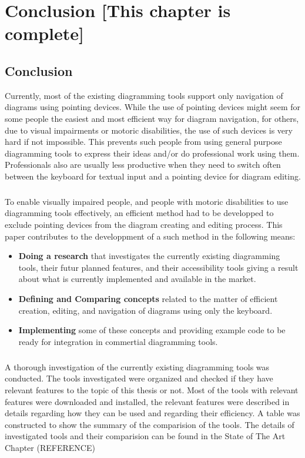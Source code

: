\chapter{Conclusion [This chapter is complete]}\label{chap:concl}
\beginchapter

\section{Conclusion}
Currently, most of the existing diagramming tools support only navigation of diagrams using pointing devices. While the use of pointing devices might seem for some people the easiest and most efficient way for diagram navigation, for others, due to visual impairments or motoric disabilities, the use of such devices is very hard if not impossible. This prevents such people from using general purpose diagramming tools to express their ideas and/or do professional work using them. Professionals also are usually less productive when they need to switch often between the keyboard for textual input and a pointing device for diagram editing. 

\paragraph{}
To enable visually impaired people, and people with motoric disabilities to use diagramming tools effectively, an efficient method had to be developped to exclude pointing devices from the diagram creating and editing process. This paper contributes to the developpment of a such method in the following means:
\begin{itemize}
\item {\bf Doing a research} that investigates the currently existing diagramming tools, their futur planned features, and their accessibility tools giving a result about what is currently implemented and available in the market.
\item {\bf Defining and Comparing concepts} related to the matter of efficient creation, editing, and navigation of diagrams using only the keyboard.
\item {\bf Implementing} some of these concepts and providing example code to be ready for integration in commertial diagramming tools.
\end{itemize}

\paragraph{}
A thorough investigation of the currently existing diagramming tools was conducted. The tools investigated were organized and checked if they have relevant features to the topic of this thesis or not. Most of the tools with relevant features were downloaded and installed, the relevant features were described in details regarding how they can be used and regarding their efficiency. A table was constructed to show the summary of the comparision of the tools. The details of investigated tools and their comparision can be found in the State of The Art Chapter (REFERENCE)

